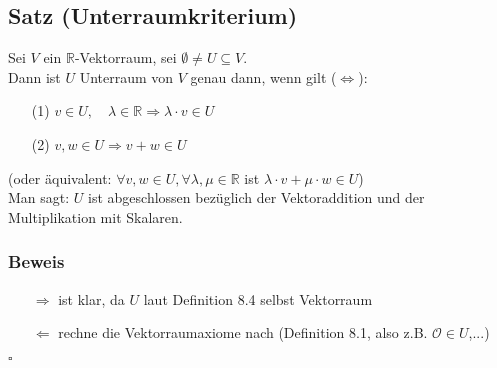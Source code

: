 \documentclass[12pt,titlepage, pdf]{article}
\newcommand{\R}{\mathds{R}}
\renewcommand{\>}{\rightarrow}
\renewcommand{\*}{\cdot}
\renewcommand{\O}{\mathcal{O}}
\begin{document}
	\subsection{Satz (Unterraumkriterium)}
	Sei $V$ ein $\R$-Vektorraum, sei $\emptyset\neq U\subseteq V$.\\
	Dann ist $U$ Unterraum von $V$ genau dann, wenn gilt ($\Leftrightarrow$):
	\begin{itemize}
		\item[(1)] $v\in U,\quad\lambda\in\R\Rightarrow\lambda\*v\in U$
		\item[(2)] $v,w\in U\Rightarrow v+w\in U$
	\end{itemize}
	(oder äquivalent: $\forall v,w\in U, \forall\lambda,\mu\in\R$ ist $\lambda\*v+\mu\*w\in U$)\\
	Man sagt: $U$ ist abgeschlossen bezüglich der Vektoraddition und der Multiplikation mit Skalaren.
	\subsubsection*{Beweis}
	\begin{itemize}
		\item[$\Rightarrow$] ist klar, da $U$ laut Definition 8.4 selbst Vektorraum
		\item[$\Leftarrow$] rechne die Vektorraumaxiome nach (Definition 8.1, also z.B. $\O\in U$,...)
	\end{itemize}
	\hfill$\square$
\end{document}
